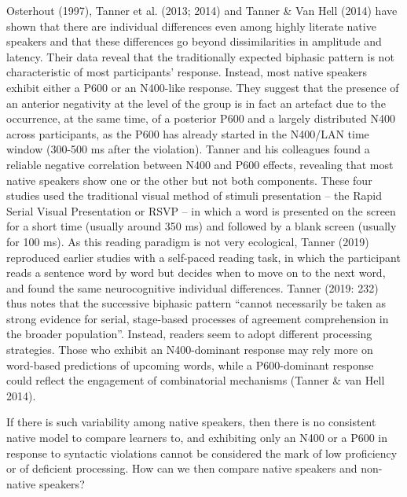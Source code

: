 \documentclass[11pt]{article}
\newenvironment{styleStandard}{\renewcommand\baselinestretch{1.0}\setlength\leftskip{0cm}\setlength\rightskip{0cm plus 1fil}\setlength\parindent{0cm}\setlength\parfillskip{0pt plus 1fil}\setlength\parskip{0in plus 1pt}\writerlistparindent\writerlistleftskip\leavevmode\normalfont\normalsize\writerlistlabel\ignorespaces}{\unskip\vspace{0.111in plus 0.0111in}\par}
\newcommand\writerlistleftskip{}
\newcommand\writerlistparindent{}
\newcommand\writerlistlabel{}
\begin{document}
\begin{styleStandard}
Osterhout (1997), Tanner et al. (2013; 2014) and Tanner \& Van Hell (2014) have shown that there are individual differences even among highly literate native speakers and that these differences go beyond dissimilarities in amplitude and latency. Their data reveal that the traditionally expected biphasic pattern is not characteristic of most participants’ response. Instead, most native speakers exhibit either a P600 or an N400-like response. They suggest that the presence of an anterior negativity at the level of the group is in fact an artefact due to the occurrence, at the same time, of a posterior P600 and a largely distributed N400 across participants, as the P600 has already started in the N400/LAN time window (300-500 ms after the violation). Tanner and his colleagues found a reliable negative correlation between N400 and P600 effects, revealing that most native speakers show one or the other but not both components. These four studies used the traditional visual method of stimuli presentation – the Rapid Serial Visual Presentation or RSVP – in which a word is presented on the screen for a short time (usually around 350 ms) and followed by a blank screen (usually for 100 ms). As this reading paradigm is not very ecological, Tanner (2019) reproduced earlier studies with a self-paced reading task, in which the participant reads a sentence word by word but decides when to move on to the next word, and found the same neurocognitive individual differences. Tanner (2019: 232) thus notes that the successive biphasic pattern “cannot necessarily be taken as strong evidence for serial, stage-based processes of agreement comprehension in the broader population”. Instead, readers seem to adopt different processing strategies. Those who exhibit an N400-dominant response may rely more on word-based predictions of upcoming words, while a P600-dominant response could reflect the engagement of combinatorial mechanisms (Tanner \& van Hell 2014). 
\end{styleStandard}

\begin{styleStandard}
If there is such variability among native speakers, then there is no consistent native model to compare learners to, and exhibiting only an N400 or a P600 in response to syntactic violations cannot be considered the mark of low proficiency or of deficient processing. How can we then compare native speakers and non-native speakers? 
\end{styleStandard}
\end{document}
